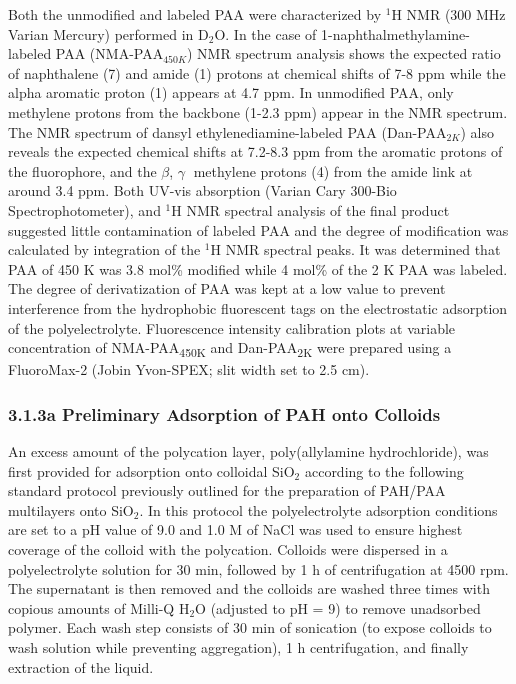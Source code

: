 \documentclass[journal=mamobx,manuscript=article]{achemso}
\begin{document}
Both the unmodified and labeled PAA were characterized by $^{1}$H NMR (300 MHz Varian Mercury) performed in D$_2$O.  In the case of 1-naphthalmethylamine-labeled PAA (NMA-PAA$_{450K}$) NMR spectrum analysis shows the expected ratio of naphthalene (7) and amide (1) protons at chemical shifts of 7-8 ppm while the alpha aromatic proton (1) appears at 4.7 ppm.  In unmodified PAA, only methylene protons from the backbone (1-2.3 ppm) appear in the NMR spectrum.  The NMR spectrum of dansyl ethylenediamine-labeled PAA (Dan-PAA$_{2K}$) also reveals the expected chemical shifts at 7.2-8.3 ppm from the aromatic protons of the fluorophore, and the $\beta$, $\gamma$ methylene protons (4) from the amide link at around 3.4 ppm.  Both UV-vis absorption (Varian Cary 300-Bio Spectrophotometer), and $^{1}$H NMR spectral analysis of the final product suggested little contamination of labeled PAA and the degree of modification was calculated by integration of the $^{1}$H NMR spectral peaks.  It was determined that PAA of 450 K was 3.8 mol\% modified while 4 mol\% of the 2 K PAA was labeled.  The degree of derivatization of PAA was kept at a low value to prevent interference from the hydrophobic fluorescent tags on the electrostatic adsorption of the polyelectrolyte.  Fluorescence intensity calibration plots at variable concentration of NMA-PAA\textsubscript{450K} and Dan-PAA\textsubscript{2K} were prepared using a FluoroMax-2 (Jobin Yvon-SPEX; slit width set to 2.5 cm). 

\subsubsection{3.1.3a Preliminary Adsorption of PAH onto Colloids}

An excess amount of the polycation layer, poly(allylamine hydrochloride), was first provided for adsorption onto colloidal SiO$_2$ according to the following standard protocol previously outlined for the preparation of PAH/PAA multilayers onto SiO$_2$.\cite{Burke2003}  In this protocol the polyelectrolyte adsorption conditions are set to a pH value of 9.0 and 1.0 M of NaCl was used to ensure highest coverage of the colloid with the polycation.  Colloids were dispersed in a polyelectrolyte solution for 30 min, followed by 1 h of centrifugation at 4500 rpm.  The supernatant is then removed and the colloids are washed three times with copious amounts of Milli-Q H$_2$O (adjusted to pH = 9) to remove unadsorbed polymer.  Each wash step consists of 30 min of sonication (to expose colloids to wash solution while preventing aggregation), 1 h centrifugation, and finally extraction of the liquid.  
\end{document}
